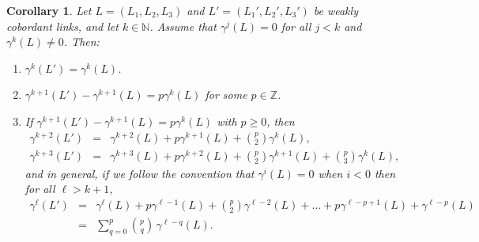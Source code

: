 \documentclass[a4paper, 11pt]{amsart}
\newtheorem{corollary}[theorem]{Corollary}
\theoremstyle{definition}
\newcommand{\N}{\mathbb{N}}
\newcommand{\Z}{\mathbb{Z}}
\begin{document}
\begin{corollary}\label{cor:lift}
Let $L=(L_1, L_2, L_3)$ and $L'=(L_1',L_2', L_3')$ be weakly cobordant links, and let $k\in \N$. Assume that $\gamma^j(L)=0$ for all $j<k$ and $\gamma^k(L)\neq 0$. Then:
\begin{enumerate}
\item \label{item:cor-gamma-k}
$\gamma^k(L')=\gamma^k(L)$.
\item \label{item:cor-gamma-k+1}
$\gamma^{k+1}(L')-\gamma^{k+1}(L)=p \gamma^k(L)$ for some $p\in \Z$.
\item \label{item:cor-gamma-ell}
If $\gamma^{k+1}(L')-\gamma^{k+1}(L)=p \gamma^k(L)$ with $p\ge 0$, then 
\begin{eqnarray*}\gamma^{k+2}(L')&=&\gamma^{k+2}(L)+p\gamma^{k+1}(L)+{p\choose 2}\gamma^k(L),\\
\gamma^{k+3}(L')&=&\gamma^{k+3}(L)+p\gamma^{k+2}(L)+{p\choose 2}\gamma^{k+1}(L)+{p\choose 3}\gamma^{k}(L),
\end{eqnarray*}
and in general, if we follow the convention that $\gamma^i(L)=0$ when $i<0$ then for all $\ell>k+1$,
\begin{eqnarray*}
\gamma^\ell(L') &=& \gamma^\ell(L)+p\gamma^{\ell-1}(L)+{p\choose 2}\gamma^{\ell-2}(L)+\dots + p\gamma^{\ell-p+1}(L)+\gamma^{\ell-p}(L) \\
&=& \sum_{q=0}^p {p\choose q}\,\gamma^{\ell-q}(L).
\end{eqnarray*}
\end{enumerate}
\end{corollary}
\end{document}
